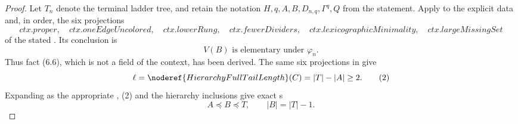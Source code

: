 \begin{proof}
Let \(T_n\) denote the terminal ladder tree, and retain the notation
\(H,q,A,B,D_{n,q},\Gamma^q,Q\) from the statement.  Apply
 to the explicit
data and, in order, the six projections
\[
 \mathit{ctx.proper},\quad \mathit{ctx.oneEdgeUncolored},\quad
 \mathit{ctx.lowerRung},\quad \mathit{ctx.fewerDividers},\quad
 \mathit{ctx.lexicographicMinimality},\quad
 \mathit{ctx.largeMissingSet}
\]
of the stated .  Its
conclusion is
\[
 V(B)\text{ is elementary under }\varphi_n.                    \tag{1}
\]
Thus fact (6.6), which is not a field of the context, has been derived.
The same six projections in
 give
\[
 \ell=\noderef{HierarchyFullTailLength}(C)
       =|T|-|A|\geq2.                                          \tag{2}
\]
Expanding  as the appropriate
, (2) and the hierarchy inclusions give exact
s
\[
                         A\preccurlyeq B\preccurlyeq T,
 \qquad |B|=|T|-1.                                             \tag{3}
\]


\end{proof}
